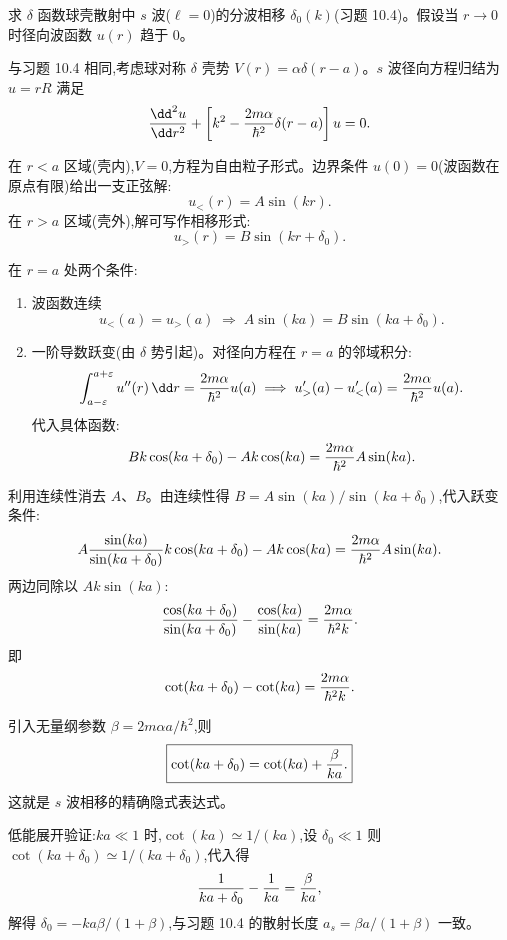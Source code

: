 \begin{question}
求 $\delta$ 函数球壳散射中 $s$ 波($\ell=0$)的分波相移 $\delta_0(k)$(习题 10.4)。假设当 $r\to0$ 时径向波函数 $u(r)$ 趋于 0。
\begin{solution}
与习题 10.4 相同,考虑球对称 $\delta$ 壳势 $V(r)=\alpha\delta(r-a)$。$s$ 波径向方程归结为 $u=rR$ 满足
\[
{\dd^2u\over\dd r^2}+\left[k^2-{2m\alpha\over\hbar^2}\delta(r-a)\right]u=0.
\]

在 $r<a$ 区域(壳内),$V=0$,方程为自由粒子形式。边界条件 $u(0)=0$(波函数在原点有限)给出一支正弦解:
\[
u_{<}(r)=A\sin(kr).
\]
在 $r>a$ 区域(壳外),解可写作相移形式:
\[
u_{>}(r)=B\sin(kr+\delta_0).
\]

在 $r=a$ 处两个条件:
\begin{enumerate}
\item 波函数连续
\[
u_{<}(a)=u_{>}(a)\;\Longrightarrow\;A\sin(ka)=B\sin(ka+\delta_0).
\]
\item 一阶导数跃变(由 $\delta$ 势引起)。对径向方程在 $r=a$ 的邻域积分:
\[
\int_{a-\varepsilon}^{a+\varepsilon}u''(r)\,\dd r={2m\alpha\over\hbar^2}u(a)
\;\Longrightarrow\;
u_{>}'(a)-u_{<}'(a)={2m\alpha\over\hbar^2}u(a).
\]
代入具体函数:
\[
Bk\cos(ka+\delta_0)-Ak\cos(ka)={2m\alpha\over\hbar^2}A\sin(ka).
\]
\end{enumerate}

利用连续性消去 $A$、$B$。由连续性得 $B=A\sin(ka)/\sin(ka+\delta_0)$,代入跃变条件:
\[
A{\sin(ka)\over\sin(ka+\delta_0)}k\cos(ka+\delta_0)-Ak\cos(ka)={2m\alpha\over\hbar^2}A\sin(ka).
\]
两边同除以 $Ak\sin(ka)$:
\[
{\cos(ka+\delta_0)\over\sin(ka+\delta_0)}-{\cos(ka)\over\sin(ka)}={2m\alpha\over\hbar^2k}.
\]
即
\[
\cot(ka+\delta_0)-\cot(ka)={2m\alpha\over\hbar^2k}.
\]

引入无量纲参数 $\beta=2m\alpha a/\hbar^2$,则
\[
\boxed{\cot(ka+\delta_0)=\cot(ka)+{\beta\over ka}.}
\]
这就是 $s$ 波相移的精确隐式表达式。

低能展开验证:$ka\ll1$ 时,$\cot(ka)\simeq 1/(ka)$,设 $\delta_0\ll1$ 则 $\cot(ka+\delta_0)\simeq 1/(ka+\delta_0)$,代入得
\[
{1\over ka+\delta_0}-{1\over ka}={\beta\over ka},
\]
解得 $\delta_0=-ka\beta/(1+\beta)$,与习题 10.4 的散射长度 $a_s=\beta a/(1+\beta)$ 一致。
\end{solution}
\end{question}

